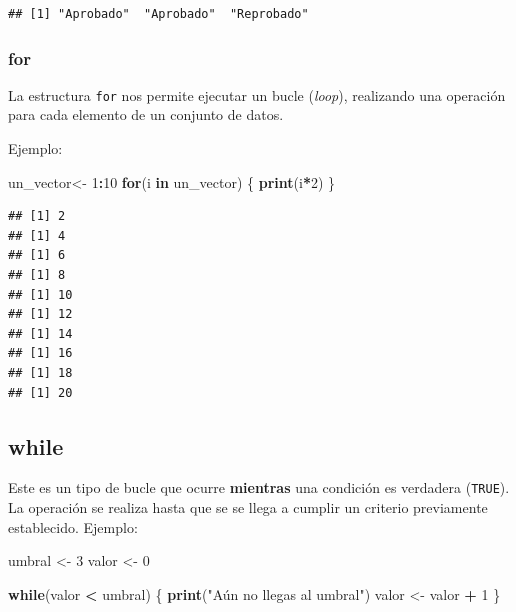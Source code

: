 \documentclass[
]{book}
\newenvironment{Shaded}{\begin{snugshade}}{\end{snugshade}}
\newcommand{\ControlFlowTok}[1]{\textcolor[rgb]{0.13,0.29,0.53}{\textbf{#1}}}
\newcommand{\DecValTok}[1]{\textcolor[rgb]{0.00,0.00,0.81}{#1}}
\newcommand{\FunctionTok}[1]{\textcolor[rgb]{0.13,0.29,0.53}{\textbf{#1}}}
\newcommand{\NormalTok}[1]{#1}
\newcommand{\OtherTok}[1]{\textcolor[rgb]{0.56,0.35,0.01}{#1}}
\newcommand{\SpecialCharTok}[1]{\textcolor[rgb]{0.81,0.36,0.00}{\textbf{#1}}}
\newcommand{\StringTok}[1]{\textcolor[rgb]{0.31,0.60,0.02}{#1}}
\begin{document}
\begin{Shaded}
\end{Shaded}

\begin{verbatim}
## [1] "Aprobado"  "Aprobado"  "Reprobado"
\end{verbatim}

\subsubsection{for}\label{for}

La estructura \texttt{for} nos permite ejecutar un bucle (\emph{loop}), realizando una operación para cada elemento de un conjunto de datos.

Ejemplo:

\begin{Shaded}
\begin{Highlighting}[]
\NormalTok{un\_vector}\OtherTok{\textless{}{-}} \DecValTok{1}\SpecialCharTok{:}\DecValTok{10}
\ControlFlowTok{for}\NormalTok{(i }\ControlFlowTok{in}\NormalTok{ un\_vector) \{}
 \FunctionTok{print}\NormalTok{(i}\SpecialCharTok{*}\DecValTok{2}\NormalTok{)}
\NormalTok{\}}
\end{Highlighting}
\end{Shaded}

\begin{verbatim}
## [1] 2
## [1] 4
## [1] 6
## [1] 8
## [1] 10
## [1] 12
## [1] 14
## [1] 16
## [1] 18
## [1] 20
\end{verbatim}

\subsection{while}\label{while}

Este es un tipo de bucle que ocurre \textbf{mientras} una condición es verdadera (\texttt{TRUE}).
La operación se realiza hasta que se se llega a cumplir un criterio previamente establecido.
Ejemplo:

\begin{Shaded}
\begin{Highlighting}[]
\NormalTok{umbral }\OtherTok{\textless{}{-}} \DecValTok{3}
\NormalTok{valor }\OtherTok{\textless{}{-}} \DecValTok{0}

\ControlFlowTok{while}\NormalTok{(valor }\SpecialCharTok{\textless{}}\NormalTok{ umbral) \{}
  \FunctionTok{print}\NormalTok{(}\StringTok{"Aún no llegas al umbral"}\NormalTok{)}
\NormalTok{  valor }\OtherTok{\textless{}{-}}\NormalTok{ valor }\SpecialCharTok{+} \DecValTok{1}
\NormalTok{\}}
\end{Highlighting}
\end{Shaded}
\end{document}
